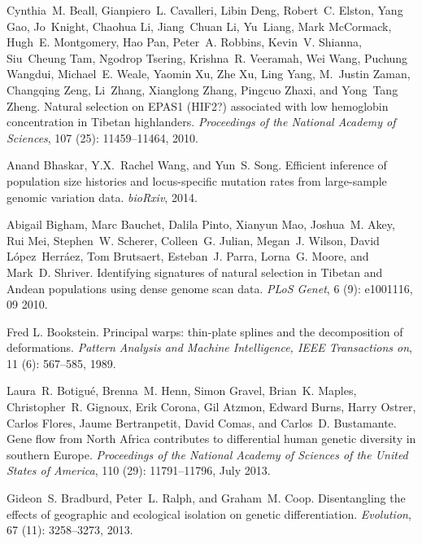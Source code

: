 \documentclass[10pt,letterpaper]{article}
\begin{document}
\begin{thebibliography}{80}
Cynthia~M. Beall, Gianpiero~L. Cavalleri, Libin Deng, Robert~C. Elston, Yang
  Gao, Jo~Knight, Chaohua Li, Jiang~Chuan Li, Yu~Liang, Mark McCormack, Hugh~E.
  Montgomery, Hao Pan, Peter~A. Robbins, Kevin~V. Shianna, Siu~Cheung Tam,
  Ngodrop Tsering, Krishna~R. Veeramah, Wei Wang, Puchung Wangdui, Michael~E.
  Weale, Yaomin Xu, Zhe Xu, Ling Yang, M.~Justin Zaman, Changqing Zeng,
  Li~Zhang, Xianglong Zhang, Pingcuo Zhaxi, and Yong~Tang Zheng.
\newblock Natural selection on {EPAS1} ({HIF2}?) associated with low hemoglobin
  concentration in {Tibetan} highlanders.
\newblock \emph{Proceedings of the National Academy of Sciences}, 107
  (25): 11459--11464, 2010.

Anand Bhaskar, Y.X.~Rachel Wang, and Yun~S. Song.
\newblock Efficient inference of population size histories and locus-specific
  mutation rates from large-sample genomic variation data.
\newblock \emph{bioRxiv}, 2014.

Abigail Bigham, Marc Bauchet, Dalila Pinto, Xianyun Mao, Joshua~M. Akey, Rui
  Mei, Stephen~W. Scherer, Colleen~G. Julian, Megan~J. Wilson, David
  López~Herráez, Tom Brutsaert, Esteban~J. Parra, Lorna~G. Moore, and Mark~D.
  Shriver.
\newblock Identifying signatures of natural selection in {Tibetan} and {Andean}
  populations using dense genome scan data.
\newblock \emph{PLoS Genet}, 6 (9): e1001116, 09 2010.

Fred L. Bookstein.
\newblock Principal warps: thin-plate splines and the decomposition of deformations.
\newblock \emph{Pattern Analysis and Machine Intelligence, IEEE Transactions on}, 
11 (6): 567--585, 1989.

Laura~R. Botigué, Brenna~M. Henn, Simon Gravel, Brian~K. Maples,
  Christopher~R. Gignoux, Erik Corona, Gil Atzmon, Edward Burns, Harry Ostrer,
  Carlos Flores, Jaume Bertranpetit, David Comas, and Carlos~D. Bustamante.
\newblock Gene flow from {North} {Africa} contributes to differential human
  genetic diversity in southern {Europe}.
\newblock \emph{Proceedings of the National Academy of Sciences of the United
  States of America}, 110 (29): 11791--11796, July 2013.

Gideon~S. Bradburd, Peter~L. Ralph, and Graham~M. Coop.
\newblock Disentangling the effects of geographic and ecological isolation on
  genetic differentiation.
\newblock \emph{Evolution}, 67 (11): 3258--3273, 2013.


\end{thebibliography}
\end{document}
